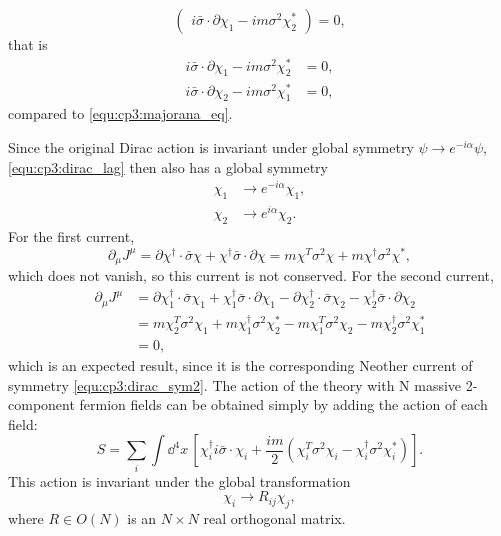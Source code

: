 \begin{problembody}
\begin{equation*}
\begin{pmatrix}
            i\bar{\sigma}\cdot\partial\chi_1 - im\sigma^2\chi_2^\ast
        \end{pmatrix} = 0,
    \end{equation*}
    that is
    \begin{subequations}\label{equ:cp3:dirac_eq_2}
        \begin{align}
            i\bar{\sigma}\cdot\partial\chi_1 - im\sigma^2\chi_2^\ast & = 0, \\
            i\bar{\sigma}\cdot\partial\chi_2 - im\sigma^2\chi_1^\ast & = 0,
        \end{align}
    \end{subequations}
    compared to \eqref{equ:cp3:majorana_eq}.

    \item Since the original Dirac action is invariant under global symmetry $\psi \to e^{-i\alpha}\psi$, \eqref{equ:cp3:dirac_lag} then also has a global symmetry
    \begin{subequations}\label{equ:cp3:dirac_sym2}
        \begin{align}
            \chi_1 & \to e^{-i\alpha}\chi_1, \\
            \chi_2 & \to e^{i\alpha}\chi_2.
        \end{align}
    \end{subequations}
    For the first current,
    \begin{equation*}
        \partial_\mu J^\mu = \partial\chi^\dagger\cdot\bar{\sigma} \chi + \chi^\dagger\bar{\sigma}\cdot\partial\chi
        = m\chi^T\sigma^2\chi + m\chi^\dagger\sigma^2\chi^\ast,
    \end{equation*}
    which does not vanish, so this current is not conserved\needverify.
    For the second current,
    \begin{align*}
        \partial_\mu J^\mu & = \partial\chi_1^\dagger\cdot\bar{\sigma}\chi_1 + \chi_1^\dagger\bar{\sigma}\cdot\partial\chi_1
        - \partial\chi_2^\dagger\cdot\bar{\sigma}\chi_2 - \chi_2^\dagger\bar{\sigma}\cdot\partial\chi_2 \\
        & = m\chi_2^T\sigma^2\chi_1 + m\chi_1^\dagger\sigma^2\chi_2^\ast - m\chi_1^T\sigma^2\chi_2 - m\chi_2^\dagger\sigma^2\chi_1^\ast\\
        & = 0,
    \end{align*}
    which is an expected result, since it is the corresponding Neother current of symmetry \eqref{equ:cp3:dirac_sym2}.
    The action of the theory with N massive 2-component fermion fields can be obtained simply by adding the action of each field:
    \begin{equation*}
        S = \sum_i \int \dd^4x \, \left[\chi_i^\dagger i\bar{\sigma}\cdot\chi_i + \frac{im}{2}\left(\chi_i^T\sigma^2\chi_i - \chi_i^\dagger\sigma^2\chi_i^\ast\right)\right].
    \end{equation*}
    This action is invariant under the global transformation
    \begin{equation*}
        \chi_i \to R_{ij}\chi_j,
    \end{equation*}
    where $R \in O(N)$ is an $N \times N$ real orthogonal matrix.


\end{problembody}
